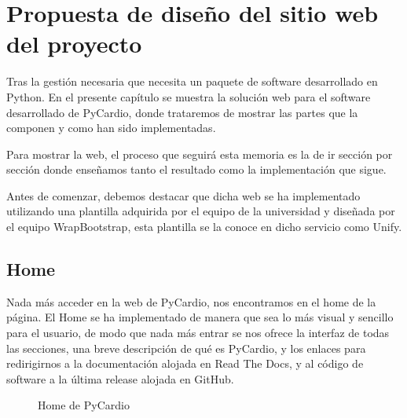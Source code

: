 \chapter{Propuesta de diseño del sitio web del proyecto}
\label{chap:webProp}
Tras la gestión necesaria que necesita un paquete de software desarrollado en Python. En el presente capítulo se muestra la solución web para el software desarrollado de PyCardio, donde trataremos de mostrar las partes que la componen y como han sido implementadas.

Para mostrar la web, el proceso que seguirá esta memoria es la de ir sección por sección donde enseñamos tanto el resultado como la implementación que sigue.

Antes de comenzar, debemos destacar que dicha web se ha implementado utilizando una plantilla adquirida por el equipo de la universidad y diseñada por el equipo WrapBootstrap, esta plantilla se la conoce en dicho servicio como Unify. 

\section{Home}
\label{sec:homeWeb}
Nada más acceder en la web de PyCardio, nos encontramos en el home de la página. El Home se ha implementado de manera que sea lo más visual y sencillo para el usuario, de modo que nada más entrar se nos ofrece la interfaz de todas las secciones, una breve descripción de qué es PyCardio, y los enlaces para redirigirnos a la documentación alojada en Read The Docs, y al código de software a la última release alojada en GitHub. 

\begin{figure}[H]
    \centering
    \caption{Home de PyCardio}
    \label{fig:homePyCardio}
\end{figure}

